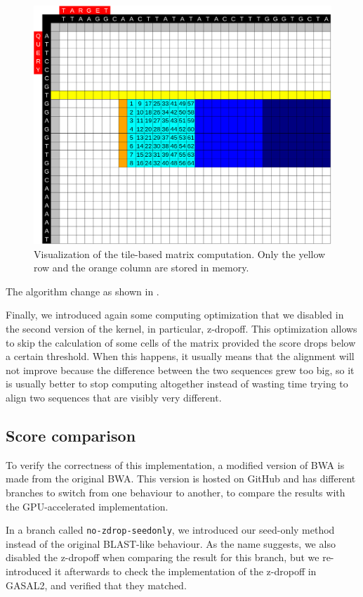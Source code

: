 \begin{figure}[h!]
	\centering
	\includegraphics[width=0.9\linewidth]{visualization-aid-tile}
	\caption{Visualization of the tile-based matrix computation. Only the yellow row and the orange column are stored in memory.}
	\label{fig:visualization-aid-tile}
\end{figure}

The algorithm change as shown in \cite{Ahmed:gasal}.

Finally, we introduced again some computing optimization that we disabled in the second version of the kernel, in particular, z-dropoff. This optimization allows to skip the calculation of some cells of the matrix provided the score drops below a certain threshold. When this happens, it usually means that the alignment will not improve because the difference between the two sequences grew too big, so it is usually better to stop computing altogether instead of wasting time trying to align two sequences that are visibly very different.

\subsection{Score comparison}

To verify the correctness of this implementation, a modified version of BWA is made from the original BWA\cite{lh3:bwa}. This version is hosted on GitHub\cite{j-levy:bwa} and has different branches to switch from one behaviour to another, to compare the results with the GPU-accelerated implementation.

In a branch called \verb|no-zdrop-seedonly|, we introduced our seed-only method instead of the original BLAST-like behaviour. As the name suggests, we also disabled the z-dropoff when comparing the result for this branch, but we re-introduced it afterwards to check the implementation of the z-dropoff in GASAL2, and verified that they matched.

